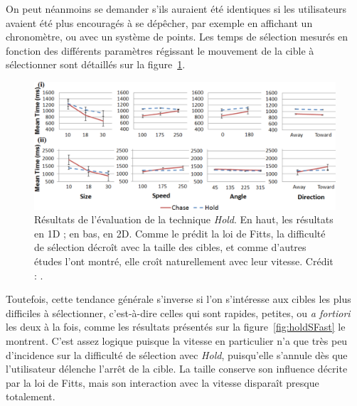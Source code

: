 	On peut néanmoins se demander s'ils auraient été identiques si les utilisateurs avaient été plus encouragés à se dépêcher, par exemple en affichant un chronomètre, ou avec un système de points. Les temps de sélection mesurés en fonction des différents paramètres régissant le mouvement de la cible à sélectionner sont détaillés sur la figure~\ref{fig:holdRes}.
	
	\begin{figure}[!htb]
		\centering
		\includegraphics[width=\textwidth]{figures/ch2/holdRes}
		\caption[\emph{Hold} -- évaluation]{Résultats de l'évaluation de la technique \emph{Hold}. En haut, les résultats en 1D ; en bas, en 2D. Comme le prédit la loi de Fitts, la difficulté de sélection décroît avec la taille des cibles, et comme d'autres études l'ont montré, elle croît naturellement avec leur vitesse.  Crédit : \cite{hajri2011moving}.}
		\label{fig:holdRes}
	\end{figure}
	
	Toutefois, cette tendance générale s'inverse si l'on s'intéresse aux cibles les plus difficiles à sélectionner, c'est-à-dire celles qui sont rapides, petites, ou \emph{a fortiori} les deux à la fois, comme les résultats présentés sur la figure~\ref{fig:holdSFast} le montrent. C'est assez logique puisque la vitesse en particulier n'a que très peu d'incidence sur la difficulté de sélection avec \emph{Hold}, puisqu'elle s'annule dès que l'utilisateur délenche l'arrêt de la cible. La taille conserve son influence décrite par la loi de Fitts, mais son interaction avec la vitesse disparaît presque totalement.
	
